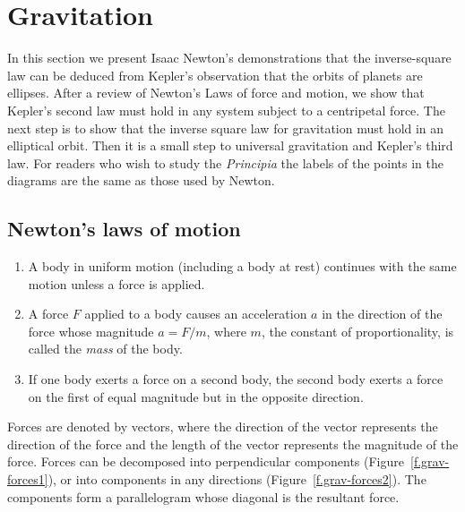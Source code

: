 

\section{Gravitation}\label{s.newton}

In this section we present Isaac Newton's demonstrations that the inverse-square law can be deduced from Kepler's observation that the orbits of planets are ellipses. After a review of Newton's Laws of force and motion,  we show that Kepler's second law must hold in any system subject to a centripetal force. The next step is to show that the inverse square law for gravitation must hold in an elliptical orbit. Then it is a small step to universal gravitation and Kepler's third law. For readers who wish to study the \emph{Principia} the labels of the points in the diagrams are the same as those used by Newton.

\subsection{Newton's laws of motion}

\begin{enumerate}
\item A body in uniform motion (including a body at rest) continues with the same motion unless a force is applied.
\item A force $F$ applied to a body causes an acceleration $a$ in the direction of the force whose magnitude $a=F/m$, where $m$, the constant of proportionality, is called the \emph{mass} of the body.
\item If one body exerts a force on a second body, the second body exerts a force on the first of equal magnitude but in the opposite direction.
\end{enumerate}
Forces are denoted by vectors, where the direction of the vector represents the direction of the force and the length of the vector represents the magnitude of the force. Forces can be decomposed into perpendicular components (Figure~\ref{f.grav-forces1}), or into components in any directions (Figure~\ref{f.grav-forces2}). The components form a parallelogram whose diagonal is the resultant force.


